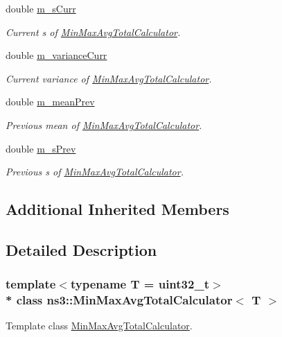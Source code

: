 \begin{DoxyCompactItemize}
double \hyperlink{classns3_1_1MinMaxAvgTotalCalculator_a8e6d192daf13e180b5445b41b2dd9434}{m\+\_\+s\+Curr}
\begin{DoxyCompactList}\small\item\em Current s of \hyperlink{classns3_1_1MinMaxAvgTotalCalculator}{Min\+Max\+Avg\+Total\+Calculator}. \end{DoxyCompactList}\item 
double \hyperlink{classns3_1_1MinMaxAvgTotalCalculator_a11c6ec89fb897ab33c4dc6169739fbfd}{m\+\_\+variance\+Curr}
\begin{DoxyCompactList}\small\item\em Current variance of \hyperlink{classns3_1_1MinMaxAvgTotalCalculator}{Min\+Max\+Avg\+Total\+Calculator}. \end{DoxyCompactList}\item 
double \hyperlink{classns3_1_1MinMaxAvgTotalCalculator_aedba5cd8e01f5f85b3f092943f21a024}{m\+\_\+mean\+Prev}
\begin{DoxyCompactList}\small\item\em Previous mean of \hyperlink{classns3_1_1MinMaxAvgTotalCalculator}{Min\+Max\+Avg\+Total\+Calculator}. \end{DoxyCompactList}\item 
double \hyperlink{classns3_1_1MinMaxAvgTotalCalculator_afaae4416144cd1c12770677913e3cb01}{m\+\_\+s\+Prev}
\begin{DoxyCompactList}\small\item\em Previous s of \hyperlink{classns3_1_1MinMaxAvgTotalCalculator}{Min\+Max\+Avg\+Total\+Calculator}. \end{DoxyCompactList}\end{DoxyCompactItemize}
\subsection*{Additional Inherited Members}


\subsection{Detailed Description}
\subsubsection*{template$<$typename T = uint32\+\_\+t$>$\\*
class ns3\+::\+Min\+Max\+Avg\+Total\+Calculator$<$ T $>$}

Template class \hyperlink{classns3_1_1MinMaxAvgTotalCalculator}{Min\+Max\+Avg\+Total\+Calculator}. 

